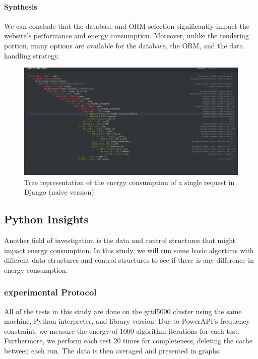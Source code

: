 \paragraph{Synthesis}

We can conclude that the database and ORM selection significantly impact the website's performance and energy consumption.
Moreover, unlike the rendering portion, many options are available for the database, the ORM, and the data handling strategy.

\begin{figure}[!hbt]
    \centering
    \includegraphics[width=\linewidth]{imgs/django_profiled_optimized}
    \caption{Tree representation of the energy consumption of a single request in Django (naive version)}
    \label{fig:django_profiled_optimized}
\end{figure}


\subsection{Python Insights}
Another field of investigation is the data and control structures that might impact energy consumption.
In this study, we will run some basic algortims with different data structures and control structures to see if there is any difference in energy consumption.
\subsubsection{experimental Protocol}
All of the tests in this study are done on the grid5000 cluster using the same machine, Python interpreter, and library version. Due to PowerAPI's frequency constraint, we measure the energy of 1000 algorithm iterations for each test. Furthermore, we perform each test 20 times for completeness, deleting the cache between each run. The data is then averaged and presented in graphs.

